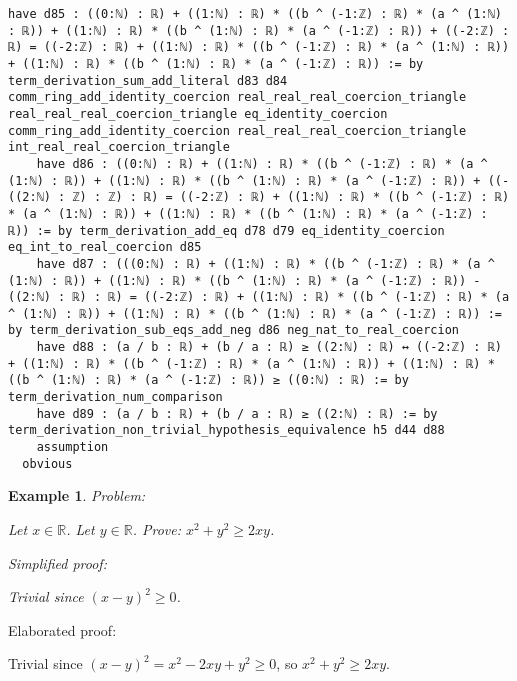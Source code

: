 \documentclass{article}
\newtheorem{example}{Example}
\begin{document}
\begin{tcolorbox}[colback=white!10, width=\linewidth]
\begin{lstlisting}[language=Lean4]
    have d85 : ((0:ℕ) : ℝ) + ((1:ℕ) : ℝ) * ((b ^ (-1:ℤ) : ℝ) * (a ^ (1:ℕ) : ℝ)) + ((1:ℕ) : ℝ) * ((b ^ (1:ℕ) : ℝ) * (a ^ (-1:ℤ) : ℝ)) + ((-2:ℤ) : ℝ) = ((-2:ℤ) : ℝ) + ((1:ℕ) : ℝ) * ((b ^ (-1:ℤ) : ℝ) * (a ^ (1:ℕ) : ℝ)) + ((1:ℕ) : ℝ) * ((b ^ (1:ℕ) : ℝ) * (a ^ (-1:ℤ) : ℝ)) := by term_derivation_sum_add_literal d83 d84 comm_ring_add_identity_coercion real_real_real_coercion_triangle real_real_real_coercion_triangle eq_identity_coercion comm_ring_add_identity_coercion real_real_real_coercion_triangle int_real_real_coercion_triangle
    have d86 : ((0:ℕ) : ℝ) + ((1:ℕ) : ℝ) * ((b ^ (-1:ℤ) : ℝ) * (a ^ (1:ℕ) : ℝ)) + ((1:ℕ) : ℝ) * ((b ^ (1:ℕ) : ℝ) * (a ^ (-1:ℤ) : ℝ)) + ((-((2:ℕ) : ℤ) : ℤ) : ℝ) = ((-2:ℤ) : ℝ) + ((1:ℕ) : ℝ) * ((b ^ (-1:ℤ) : ℝ) * (a ^ (1:ℕ) : ℝ)) + ((1:ℕ) : ℝ) * ((b ^ (1:ℕ) : ℝ) * (a ^ (-1:ℤ) : ℝ)) := by term_derivation_add_eq d78 d79 eq_identity_coercion eq_int_to_real_coercion d85
    have d87 : (((0:ℕ) : ℝ) + ((1:ℕ) : ℝ) * ((b ^ (-1:ℤ) : ℝ) * (a ^ (1:ℕ) : ℝ)) + ((1:ℕ) : ℝ) * ((b ^ (1:ℕ) : ℝ) * (a ^ (-1:ℤ) : ℝ)) - ((2:ℕ) : ℝ) : ℝ) = ((-2:ℤ) : ℝ) + ((1:ℕ) : ℝ) * ((b ^ (-1:ℤ) : ℝ) * (a ^ (1:ℕ) : ℝ)) + ((1:ℕ) : ℝ) * ((b ^ (1:ℕ) : ℝ) * (a ^ (-1:ℤ) : ℝ)) := by term_derivation_sub_eqs_add_neg d86 neg_nat_to_real_coercion
    have d88 : (a / b : ℝ) + (b / a : ℝ) ≥ ((2:ℕ) : ℝ) ↔ ((-2:ℤ) : ℝ) + ((1:ℕ) : ℝ) * ((b ^ (-1:ℤ) : ℝ) * (a ^ (1:ℕ) : ℝ)) + ((1:ℕ) : ℝ) * ((b ^ (1:ℕ) : ℝ) * (a ^ (-1:ℤ) : ℝ)) ≥ ((0:ℕ) : ℝ) := by term_derivation_num_comparison
    have d89 : (a / b : ℝ) + (b / a : ℝ) ≥ ((2:ℕ) : ℝ) := by term_derivation_non_trivial_hypothesis_equivalence h5 d44 d88
    assumption
  obvious

\end{lstlisting}
\end{tcolorbox}


\begin{example}
Problem:
\begin{tcolorbox}[colback=yellow!10, width=\linewidth]
Let $x\in\mathbb{R}$. Let $y\in\mathbb{R}$.
    Prove: $x^2 + y^2 \ge 2xy$.
\end{tcolorbox}

Simplified proof:
\begin{tcolorbox}[colback=blue!10, width=\linewidth]
Trivial since $(x-y)^2 \ge 0$.
\end{tcolorbox}
\end{example}

Elaborated proof:
\begin{tcolorbox}[colback=green!10, width=\linewidth]
Trivial since $(x-y)^2 = x^2 -2xy + y^2 \ge 0$, so $x^2 + y^2 \ge 2xy$.
\end{tcolorbox}
\end{document}
